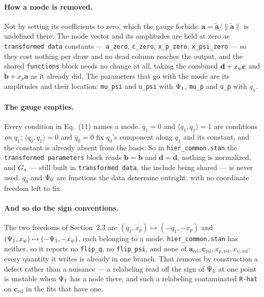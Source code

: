\documentclass[11pt]{article}
\newcommand{\file}[1]{\texttt{#1}}
\newcommand{\code}[1]{\texttt{#1}}
\begin{document}
\paragraph{How a mode is removed.} Not by setting its coefficients to zero, which the gauge
forbids: $\mathbf{a} = \tilde{\mathbf{a}}/\lVert\tilde{\mathbf{a}}\rVert$ is undefined there.
The mode vector and its amplitudes are held at zero as \code{transformed data} constants ---
\code{a\_zero}, \code{c\_zero}, \code{x\_p\_zero}, \code{x\_psi\_zero} --- so they cost
nothing per draw and no dead column reaches the output, and the shared \code{functions}
block needs no change at all, taking the combined $\mathbf{d} + x_{\psi}\mathbf{c}$ and
$\mathbf{b} + x_p\mathbf{a}$ as it already did. The parameters that go with the mode are its
amplitudes and their location: \code{mu\_psi} and \code{u\_psi} with $\Psi_{1}$,
\code{mu\_p} and \code{u\_p} with $q_{1}$.

\paragraph{The gauge empties.} Every condition in Eq.~(11) names a mode. $\bar q_{1} = 0$
and $\langle q_{1},q_{1}\rangle = 1$ are conditions \emph{on} $q_{1}$;
$\langle q_{0},q_{1}\rangle = 0$ and $\bar q_{0} = 0$ fix $q_{0}$'s component along $q_{1}$
and its constant, and the constant is already absent from the basis. So in
\file{hier\_common.stan} the \code{transformed parameters} block reads
$\mathbf{b} = \tilde{\mathbf{b}}$ and $\mathbf{d} = \tilde{\mathbf{d}}$, nothing is
normalized, and $G_{s}$ --- still built in \code{transformed data}, the include being
shared --- is never used. $q_{0}$ and $\Psi_{0}$ are functions the data determine outright,
with no coordinate freedom left to fix.

\paragraph{And so do the sign conventions.} The two freedoms of Section~2.3 are
$(q_{1}, x_p) \mapsto (-q_{1}, -x_p)$ and $(\Psi_{1}, x_{\psi}) \mapsto
(-\Psi_{1}, -x_{\psi})$, each belonging to a mode. \file{hier\_common.stan} has neither, so
it reports no \code{flip\_q}, no \code{flip\_psi}, and none of
$\mathbf{a}_{\mathrm{rel}}, \mathbf{c}_{\mathrm{rel}}, x_{p,\mathrm{rel}},
x_{\psi,\mathrm{rel}}$: every quantity it writes is already in one branch. That removes by
construction a defect rather than a nuisance --- a relabeling read off the sign of
$\Psi_{1}$ at one point is unstable when $\Psi_{1}$ has a node there, and such a relabeling
contaminated \code{R-hat} on $\mathbf{c}_{\mathrm{rel}}$ in the fits that have one.
\end{document}
